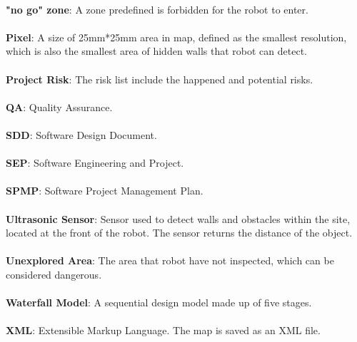 \documentclass[11pt, a4paper]{report}
\begin{document}
\\ \textbf{"no go" zone}: A zone predefined is forbidden for the robot to enter. \\
\\ \textbf{Pixel}: A size of 25mm*25mm area in map, defined as the smallest resolution, which is also the smallest area of hidden walls that robot can detect.  \\
\\ \textbf{Project Risk}: The risk list include the happened and potential risks.\\
\\ \textbf{QA}: Quality Assurance.\\
\\ \textbf{SDD}: Software Design Document.\\
\\ \textbf{SEP}: Software Engineering and Project.\\
\\ \textbf{SPMP}: Software Project Management Plan.\\
\\ \textbf{Ultrasonic Sensor}: Sensor used to detect walls and obstacles within the site, located at the front of the robot. The sensor returns the distance of the object.\\
\\ \textbf{Unexplored Area}: The area that robot have not inspected, which can be considered dangerous.  \\
\\ \textbf{Waterfall Model}: A sequential design model made up of five stages.\\
\\ \textbf{XML}: Extensible Markup Language. The map is saved as an XML file.
\end{document}
